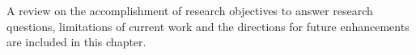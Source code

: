 A review on the accomplishment of research objectives to answer research questions, limitations
of current work and the directions for future enhancements are included in this chapter. 

